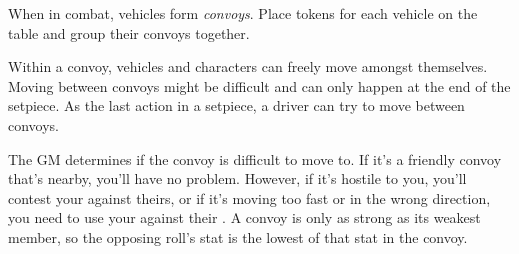 
When in combat, vehicles form \emph{convoys}. Place tokens for each vehicle on the table and group their convoys together.

Within a convoy, vehicles and characters can freely move amongst themselves. Moving between convoys might be difficult and can only happen at the end of the setpiece. As the last action in a setpiece, a driver can try to move between convoys.

The GM determines if the convoy is difficult to move to. If it's a friendly convoy that's nearby, you'll have no problem. However, if it's hostile to you, you'll contest your  against theirs, or if it's moving too fast or in the wrong direction, you need to use your  against their . A convoy is only as strong as its weakest member, so the opposing roll's stat is the lowest of that stat in the convoy.
